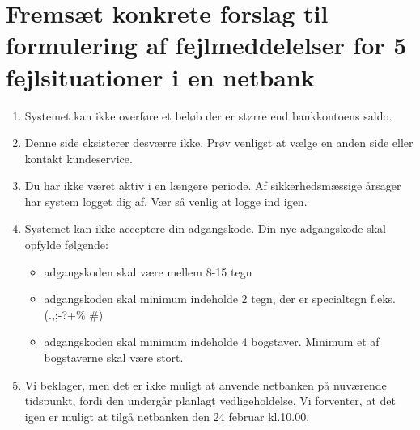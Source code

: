 \documentclass[12pt]{article}
\begin{document}
\section*{Fremsæt konkrete forslag til formulering af fejlmeddelelser
           for 5 fejlsituationer i en netbank} 
\begin{enumerate}
  \item Systemet kan ikke overføre et beløb der er større end bankkontoens saldo.
  \item Denne side eksisterer desværre ikke. Prøv venligst at vælge en anden side eller kontakt kundeservice.
  \item Du har ikke været aktiv i en længere periode. Af sikkerhedsmæssige årsager har system logget dig af. Vær så venlig at logge ind igen.
  \item Systemet kan ikke acceptere din adgangskode. Din nye adgangskode skal opfylde følgende: \begin{itemize}
    \item adgangskoden skal være mellem 8-15 tegn
    \item adgangskoden skal minimum indeholde 2 tegn, der er specialtegn f.eks. (.,;-?+\% \#)
    \item adgangskoden skal minimum indeholde 4 bogstaver. Minimum et af bogstaverne skal være stort.
  \end{itemize}
\item Vi beklager, men det er ikke muligt at anvende netbanken på nuværende tidspunkt, fordi den undergår planlagt vedligeholdelse. Vi forventer, at det igen er muligt at tilgå netbanken den 24 februar kl.10.00.

\end{enumerate}
\end{document}
